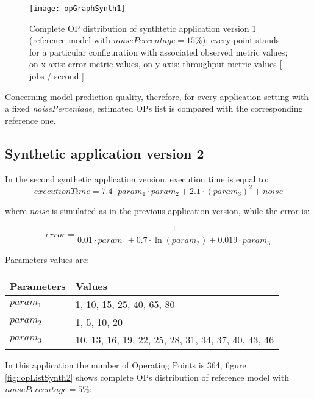 \begin{figure}[H]

    \centering
    \texttt{[image: opGraphSynth1]}
    \caption{Complete OP distribution of synthtetic application version 1 (reference model with $noisePercentage = 15\%$); every point stands for a particular configuration with associated observed metric values; on x-axis: error metric values, on y-axis: throughput metric values [ jobs / second ]}
    \label{fig::opListSynth1}
    
\end{figure}

Concerning model prediction quality, therefore, for every application setting with a fixed \textit{noisePercentage}, estimated OPs list is compared with the corresponding reference one.


\subsection{Synthetic application version 2}

In the second synthetic application version, execution time is equal to:
\[
executionTime = 7.4 \cdot param_1 \cdot param_2 + 2.1 \cdot (param_3)^2 + noise
\]

where \textit{noise} is simulated as in the previous application version, while the error is:

\[
error = \dfrac{1}{0.01 \cdot param_1 + 0.7 \cdot \ln{(param_2)} + 0.019 \cdot param_3}
\]

Parameters values are:

\begin{center}

    \begin{tabular}{ll}
    
        \toprule
        Parameters & Values \\
        \midrule
        $param_1$ & 1, 10, 15, 25, 40, 65, 80 \\
        $param_2$ & 1, 5, 10, 20 \\
        $param_3$ & 10, 13, 16, 19, 22, 25, 28, 31, 34, 37, 40, 43, 46 \\
        \bottomrule 
    
    \end{tabular}

\end{center}

In this application the number of Operating Points is 364; figure \ref{fig::opListSynth2} shows complete OPs distribution of reference model with $noisePercentage = 5\%$:

